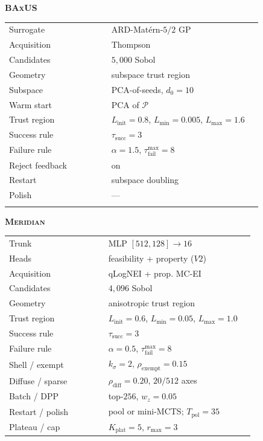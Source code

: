 \documentclass{article}
\newcommand{\meridian}{\textsc{Meridian}}
\newcommand{\baxus}{\textsc{BAxUS}}
\begin{document}
\begin{table}[t]
  \vspace{4pt}

  \begin{minipage}[t]{0.48\textwidth}
    \centering
    \textbf{\baxus{}}\\[1pt]
    \begin{tabular}{@{}p{0.38\linewidth}p{0.56\linewidth}@{}}
      \toprule
      Surrogate & ARD-Mat\'ern-$5/2$ GP \\
      Acquisition & Thompson \\
      Candidates & $5{,}000$ Sobol \\
      Geometry & subspace trust region \\
      Subspace & PCA-of-seeds, $d_0=10$ \\
      Warm start & PCA of $\mathcal{P}$ \\
      Trust region & $L_{\mathrm{init}}=0.8$, $L_{\min}=0.005$, $L_{\max}=1.6$ \\
      Success rule & $\tau_{\mathrm{succ}}=3$ \\
      Failure rule & $\alpha=1.5$, $\tau_{\mathrm{fail}}^{\max}=8$ \\
      Reject feedback & on \\
      Restart & subspace doubling \\
      Polish & --- \\
      \\
      \bottomrule
    \end{tabular}
  \end{minipage}\hfill
  \begin{minipage}[t]{0.48\textwidth}
    \centering
    \textbf{\meridian{}}\\[1pt]
    \begin{tabular}{@{}p{0.38\linewidth}p{0.56\linewidth}@{}}
      \toprule
      Trunk & MLP $[512,128]\to 16$ \\
      Heads & feasibility + property ($V2$) \\
      Acquisition & qLogNEI + prop. MC-EI \\
      Candidates & $4{,}096$ Sobol \\
      Geometry & anisotropic trust region \\
      Trust region & $L_{\mathrm{init}}=0.6$, $L_{\min}=0.05$, $L_{\max}=1.0$ \\
      Success rule & $\tau_{\mathrm{succ}}=3$ \\
      Failure rule & $\alpha=0.5$, $\tau_{\mathrm{fail}}^{\max}=8$ \\
      Shell / exempt & $k_\sigma=2$, $\rho_{\mathrm{exempt}}=0.15$ \\
      Diffuse / sparse & $\rho_{\mathrm{diff}}=0.20$, $20/512$ axes \\
      Batch / DPP & top-$256$, $w_z=0.05$ \\
      Restart / polish & pool or mini-MCTS; $T_{\mathrm{pol}}=35$ \\
      Plateau / cap & $K_{\mathrm{plat}}=5$, $r_{\max}=3$ \\
      \bottomrule
    \end{tabular}
  \end{minipage}
\end{table}
\end{document}
